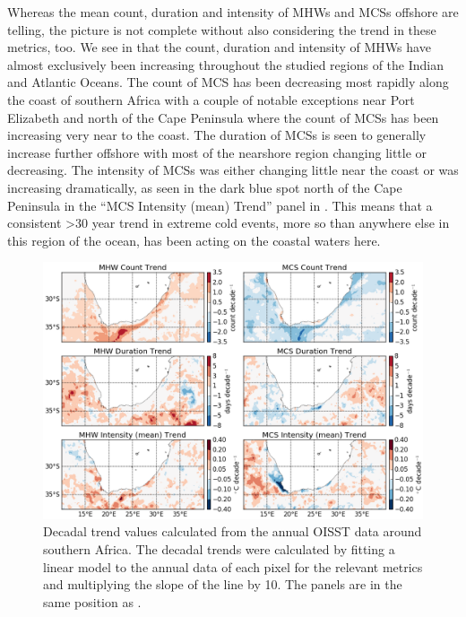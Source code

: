 \documentclass[a4paper,10pt,review]{elsarticle}
\begin{document}
Whereas the mean count, duration and intensity of MHWs and MCSs offshore are telling, the picture is not complete without also considering the trend in these metrics, too. We see in  that the count, duration and intensity of MHWs have almost exclusively been increasing throughout the studied regions of the Indian and Atlantic Oceans. The count of MCS has been decreasing most rapidly along the coast of southern Africa with a couple of notable exceptions near Port Elizabeth and north of the Cape Peninsula where the count of MCSs has been increasing very near to the coast. The duration of MCSs is seen to generally increase further offshore with most of the nearshore region changing little or decreasing. The intensity of MCSs was either changing little near the coast or was increasing dramatically, as seen in the dark blue spot north of the Cape Peninsula in the ``MCS Intensity (mean) Trend'' panel in . This means that a consistent >30 year trend in extreme cold events, more so than anywhere else in this region of the ocean, has been acting on the coastal waters here.

\begin{figure}
\centering \includegraphics[width=1.0\textwidth]{MHW_MCS_trend.png}
\caption{Decadal trend values calculated from the annual OISST data around southern Africa. The decadal trends were calculated by fitting a linear model to the annual data of each pixel for the relevant metrics and multiplying the slope of the line by 10. The panels are in the same position as .}
\label{fig:Figure7}
\end{figure}
\end{document}
